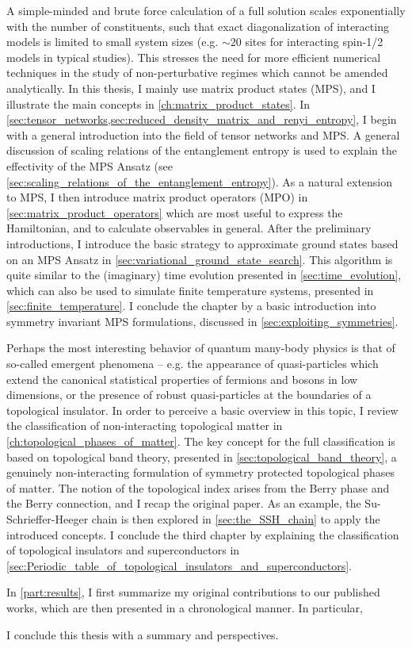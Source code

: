 A simple-minded and brute force calculation of a full solution scales exponentially with the number of constituents, such that exact diagonalization of interacting models is limited to small system sizes (e.g. $\sim 20$ sites for interacting spin-1/2 models in typical studies).
This stresses the need for more efficient numerical techniques in the study of non-perturbative regimes which cannot be amended analytically.
In this thesis, I mainly use matrix product states (MPS), and I illustrate the main concepts in \cref{ch:matrix_product_states}.
In \cref{sec:tensor_networks,sec:reduced_density_matrix_and_renyi_entropy}, I begin with a general introduction into the field of tensor networks and MPS.
A general discussion of scaling relations of the entanglement entropy is used to explain the effectivity of the MPS Ansatz (see \cref{sec:scaling_relations_of_the_entanglement_entropy}).
As a natural extension to MPS, I then introduce matrix product operators (MPO) in \cref{sec:matrix_product_operators} which are most useful to express the Hamiltonian, and to calculate observables in general.
After the preliminary introductions, I introduce the basic strategy to approximate ground states based on an MPS Ansatz in \cref{sec:variational_ground_state_search}.
This algorithm is quite similar to the (imaginary) time evolution presented in \cref{sec:time_evolution}, which can also be used to simulate finite temperature systems, presented in \cref{sec:finite_temperature}.
I conclude the chapter by a basic introduction into symmetry invariant MPS formulations, discussed in \cref{sec:exploiting_symmetries}.

Perhaps the most interesting behavior of quantum many-body physics is that of so-called emergent phenomena -- e.g. the appearance of quasi-particles which extend the canonical statistical properties of fermions and bosons in low dimensions, or the presence of robust quasi-particles at the boundaries of a topological insulator.
In order to perceive a basic overview in this topic, I review the classification of non-interacting topological matter in \cref{ch:topological_phases_of_matter}.
The key concept for the full classification is based on topological band theory, presented in \cref{sec:topological_band_theory}, a genuinely non-interacting formulation of symmetry protected topological phases of matter.
The notion of the topological index arises from the Berry phase and the Berry connection, and I recap the original paper.
As an example, the Su-Schrieffer-Heeger chain is then explored in \cref{sec:the_SSH_chain} to apply the introduced concepts.
I conclude the third chapter by explaining the classification of topological insulators and superconductors in \cref{sec:Periodic_table_of_topological_insulators_and_superconductors}.

In \cref{part:results}, I first summarize my original contributions to our published works, which are then presented in a chronological manner.
In particular,

I conclude this thesis with a summary and perspectives.
